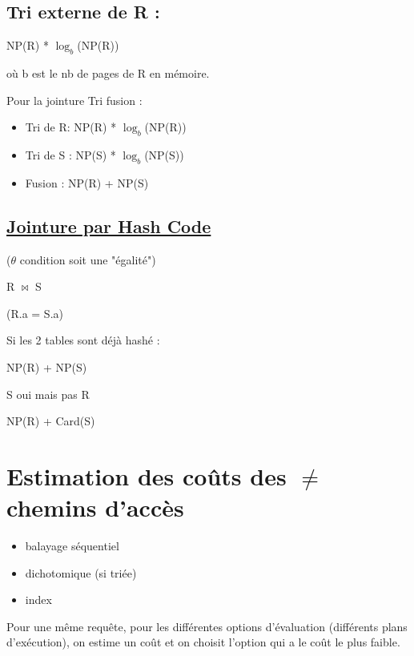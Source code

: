 \documentclass{article}
\begin{document}
\subsection*{Tri externe de R :}
NP(R) * $\log_b$(NP(R))

où b est le nb de pages de R en mémoire.

Pour la jointure Tri fusion :
\begin{itemize}
	\item Tri de R: NP(R) * $\log_b$(NP(R))
	\item Tri de S : NP(S) * $\log_b$(NP(S))
	\item Fusion : NP(R) + NP(S)
\end{itemize}

\subsection*{\underline{Jointure par Hash Code}}

($\theta$ condition soit une "égalité")

R $\bowtie$ S    

(R.a = S.a)

\begin{algorithm}

\end{algorithm}

Si les 2 tables sont déjà hashé :

NP(R) + NP(S)

S oui mais pas R

NP(R) + Card(S)

\section*{Estimation des coûts des $\neq$ chemins d'accès}

\begin{itemize}
	\item balayage séquentiel
	\item dichotomique (si triée)
	\item index
\end{itemize}

Pour une même requête, pour les différentes options d'évaluation (différents plans d'exécution), on estime un coût et on choisit l'option qui a le coût le plus faible.
\end{document}
